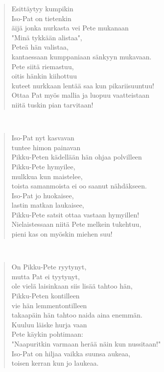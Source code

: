 \noindent\begin{minipage}{\linewidth}
\begin{verse}
	Esittäytyy kumpikin\\
	Iso-Pat on tietenkin\\
	äijä jonka nurkasta vei Pete mukanaan\\
	"Minä tykkään alistaa",\\
	Peteä hän valistaa,\\
	kantaessaan kumppaniaan sänkyyn mukavaan.\\
	Pete siitä riemastuu,\\
	oitis hänkin kiihottuu\\
	kuteet nurkkaan lentää saa kun pikariisuuntuu!\\
	Ottaa Pat myös mallia ja luopuu vaatteistaan\\
	niitä tuskin pian tarvitaan!\\
\end{verse}
\end{minipage}\\[10pt]
\noindent\begin{minipage}{\linewidth}
\begin{verse}
	Iso-Pat nyt kasvavan\\
	tuntee himon painavan\\
	Pikku-Peten kädellään hän ohjaa polvilleen\\
	Pikku-Pete hymyilee,\\
	mulkkua kun maistelee,\\
	toista samanmoista ei oo saanut nähdäkseen.\\
	Iso-Pat jo huokaisee,\\
	lastin matkan laukaisee,\\
	Pikku-Pete satsit ottaa vastaan hymyillen!\\
	Nielaistessaan niitä Pete melkein tukehtuu,\\
	pieni kas on myöskin miehen suu!\\
\end{verse}
\end{minipage}\\[10pt]
\noindent\begin{minipage}{\linewidth}
\begin{verse}
	On Pikku-Pete ryytynyt,\\
	mutta Pat ei tyytynyt,\\
	ole vielä laisinkaan siis lisää tahtoo hän,\\
	Pikku-Peten kontilleen\\
	vie hän lemmentontilleen\\
	takaapäin hän tahtoo naida aina enemmän.\\
	Kuuluu läiske hurja vaan\\
	Pete käykin pohtimaan:\\
	"Naapuritkin varmaan herää näin kun nussitaan!"\\
	Iso-Pat on hiljaa vaikka suunsa aukeaa,\\
	toisen kerran kun jo laukeaa.\\
\end{verse}
\end{minipage}\\[10pt]
